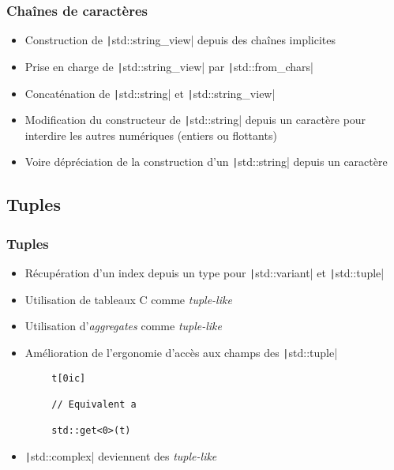 \documentclass[C++.tex]{subfiles}
\begin{document}
\begin{frame}[fragile]
	\frametitle{Chaînes de caractères}
	\begin{itemize}
		\item Construction de \texttt|std::string_view| depuis des chaînes implicites
		\item Prise en charge de \texttt|std::string_view| par \texttt|std::from_chars|
		\item Concaténation de \texttt|std::string| et \texttt|std::string_view|
		\item Modification du constructeur de \texttt|std::string| depuis un caractère pour interdire les autres numériques (entiers ou flottants)


		\item Voire dépréciation de la construction d'un \texttt|std::string| depuis un caractère
	\end{itemize}
\end{frame}

\subsection*{Tuples}
\begin{frame}[fragile]
	\frametitle{Tuples}
	\begin{itemize}
		\item Récupération d'un index depuis un type pour \texttt|std::variant| et \texttt|std::tuple|
		\item Utilisation de tableaux C comme \textit{tuple-like}


		\item Utilisation d'\textit{aggregates} comme \textit{tuple-like}
		\item Amélioration de l'ergonomie d'accès aux champs des \texttt|std::tuple|
	\end{itemize}

	\begin{verbatim}
		t[0ic]

		// Equivalent a

		std::get<0>(t)
	\end{verbatim}

	\begin{itemize}
		\item \texttt|std::complex| deviennent des \textit{tuple-like}
	\end{itemize}
\end{frame}
\end{document}
